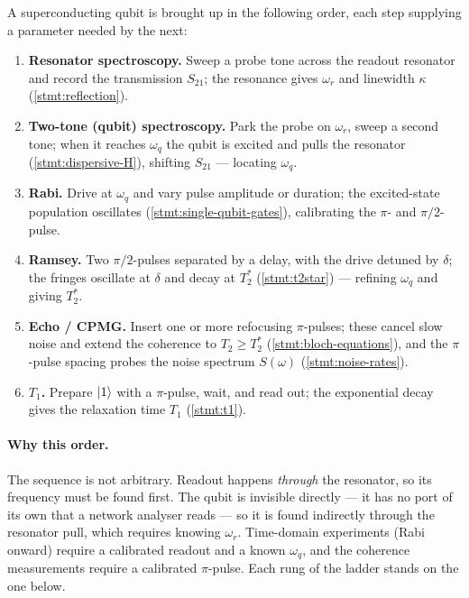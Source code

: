 \begin{statement}
\label{stmt:bringup}
A superconducting qubit is brought up in the following order, each step
supplying a parameter needed by the next:
\begin{enumerate}
\item \textbf{Resonator spectroscopy.} Sweep a probe tone across the
  readout resonator and record the transmission $S_{21}$; the resonance
  gives $\omega_r$ and linewidth $\kappa$ (\cref{stmt:reflection}).
\item \textbf{Two-tone (qubit) spectroscopy.} Park the probe on
  $\omega_r$, sweep a second tone; when it reaches $\omega_q$ the qubit
  is excited and pulls the resonator (\cref{stmt:dispersive-H}),
  shifting $S_{21}$ --- locating $\omega_q$.
\item \textbf{Rabi.} Drive at $\omega_q$ and vary pulse amplitude or
  duration; the excited-state population oscillates
  (\cref{stmt:single-qubit-gates}), calibrating the $\pi$- and
  $\pi/2$-pulse.
\item \textbf{Ramsey.} Two $\pi/2$-pulses separated by a delay, with the
  drive detuned by $\delta$; the fringes oscillate at $\delta$ and decay
  at $T_2^*$ (\cref{stmt:t2star}) --- refining $\omega_q$ and giving
  $T_2^*$.
\item \textbf{Echo / CPMG.} Insert one or more refocusing $\pi$-pulses;
  these cancel slow noise and extend the coherence to $T_2\ge T_2^*$
  (\cref{stmt:bloch-equations}), and the $\pi$-pulse spacing probes the
  noise spectrum $S(\omega)$ (\cref{stmt:noise-rates}).
\item \textbf{$T_1$.} Prepare $\ket1$ with a $\pi$-pulse, wait, and
  read out; the exponential decay gives the relaxation time $T_1$
  (\cref{stmt:t1}).
\end{enumerate}
\end{statement}

\paragraph{Why this order.}
The sequence is not arbitrary. Readout happens \emph{through} the
resonator, so its frequency must be found first. The qubit is invisible
directly --- it has no port of its own that a network analyser reads ---
so it is found indirectly through the resonator pull, which requires
knowing $\omega_r$. Time-domain experiments (Rabi onward) require a
calibrated readout and a known $\omega_q$, and the coherence
measurements require a calibrated $\pi$-pulse. Each rung of the ladder
stands on the one below.

